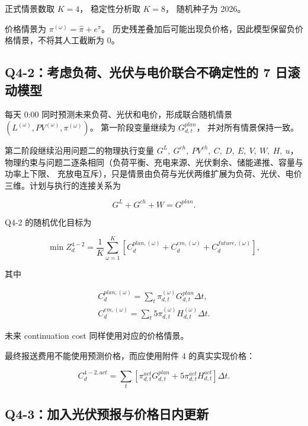 正式情景数取 \(K=4\)， 稳定性分析取 \(K=8\)， 随机种子为 2026。

价格情景为 \(\pi^{(\omega)}
=
\hat\pi+e^\pi\)。 历史残差叠加后可能出现负价格，因此模型保留负价格情景，不将其人工截断为 0。

\subsection{Q4-2：考虑负荷、光伏与电价联合不确定性的 7 日滚动模型}

每天 0:00 同时预测未来负荷、光伏和电价，形成联合随机情景 \(\left(
L^{(\omega)},
PV^{(\omega)},
\pi^{(\omega)}
\right)\)。 第一阶段变量继续为 \(G^{plan}_{d,t}\)， 并对所有情景保持一致。

第二阶段继续沿用问题二的物理执行变量 \(G^L,\ G^{ch},\ PV^{ch},\ C,\ D,\ E,\ V,\ W,\ H,\ u\)，
物理约束与问题二逐条相同（负荷平衡、充电来源、光伏剩余、储能递推、容量与功率上下限、
充放电互斥），只是情景由负荷与光伏两维扩展为负荷、光伏、电价三维。计划与执行的连接关系为

\begin{equation}
G^L+G^{ch}+W=G^{plan}.
\end{equation}

Q4-2 的随机优化目标为

\begin{equation}
\min Z_d^{4-2}
=
\frac1K
\sum_{\omega=1}^{K}
\left[
C_d^{plan,(\omega)}
+
C_d^{em,(\omega)}
+
C_d^{future,(\omega)}
\right],
\end{equation}

其中

\begin{equation}
\begin{gathered}
C_d^{plan,(\omega)}
=
\sum_t
\pi_{d,t}^{(\omega)}
G_{d,t}^{plan}
\Delta t,\\
C_d^{em,(\omega)}
=
\sum_t
5\pi_{d,t}^{(\omega)}
H_{d,t}^{(\omega)}
\Delta t.
\end{gathered}
\end{equation}

未来 continuation cost 同样使用对应的价格情景。

最终报送费用不能使用预测价格，而应使用附件 4 的真实实现价格：

\begin{equation}
C_d^{4-2,act}
=
\sum_t
\left[
\pi_{d,t}^{act}G_{d,t}^{plan}
+
5\pi_{d,t}^{act}H_{d,t}^{act}
\right]\Delta t.
\end{equation}

\subsection{Q4-3：加入光伏预报与价格日内更新}

